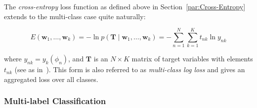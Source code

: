 The \emph{cross-entropy} loss function as defined above in Section~\ref{par:Cross-Entropy} extends to the multi-class case quite naturally:

\begin{equation}
  E(\mathbf{w}_1, \ldots, \mathbf{w}_k) = -\ln p(\mathbf{T} \mid \mathbf{w}_1, \ldots, \mathbf{w}_k) = - \sum_{n=1}^N \sum_{k=1}^K t_{nk} \ln y_{nk}
\end{equation}

where $y_{nk} = y_k (\phi_n)$, and $\mathbf{T}$ is an  $N \times K$ matrix of target variables with elements $t_{nk}$ (see as in~\cite[Chapter 4.3.4, p.~209 ]{Bishop:2006aa}). This form is also referred to as \emph{multi-class log loss} and gives an aggregated loss over all classes. 

\subsubsection{Multi-label Classification}
\label{subs:Multi-label Classification}

%
%
